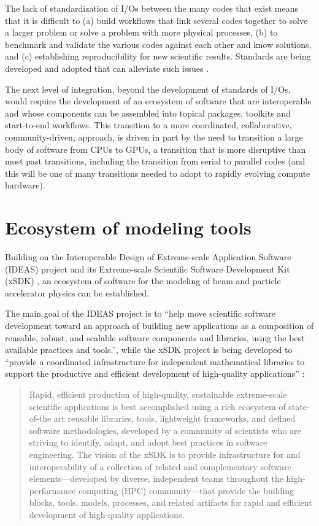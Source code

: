 \documentclass[11pt,sort&compress]{article}
\begin{document}
The lack of standardization of I/Os between the many codes that exist means that it is difficult to (a) build workflows that link several codes together to solve a larger problem or solve a problem with more physical processes, (b) to benchmark and validate the various codes against each other and know solutions, and (c) establishing reproducibility for new scientific results. Standards are being developed and adopted that can alleviate such issues \cite{LOI_standards}. 

The next level of integration, beyond the development of standards of I/Os, would require the development of an ecosystem of software that are interoperable and whose components can be assembled into topical packages, toolkits and start-to-end workflows. This transition to a more coordinated, collaborative, community-driven, approach, is driven in part by the need to transition a large body of software from CPUs to GPUs, a transition that is more disruptive than most past transitions, including the transition from serial to parallel codes (and this will be one of many transitions needed to adopt to rapidly evolving compute hardware).

\section{Ecosystem of modeling tools}

Building on the Interoperable Design of Extreme-scale Application Software (IDEAS) project \cite{IDEAS} and its Extreme-scale Scientific Software Development Kit (xSDK) \cite{xSDK}, an ecosystem of software for the modeling of beam and particle accelerator physics can be established.

The main goal of the IDEAS project is to ``help move scientific software development toward an approach of building new applications as a composition of reusable, robust, and scalable software components and libraries, using the best available practices and tools.'', while the 
xSDK project is being developed to ``provide a coordinated infrastructure for independent mathematical libraries to support the productive and efficient development of high-quality applications'' \cite{xSDK}:

\begin{quote}
Rapid, efficient production of high-quality, sustainable extreme-scale scientific applications is best accomplished using a rich ecosystem of state-of-the art reusable libraries, tools, lightweight frameworks, and defined software methodologies, developed by a community of scientists who are striving to identify, adapt, and adopt best practices in software engineering. The vision of the xSDK is to provide infrastructure for and interoperability of a collection of related and complementary software elements—developed by diverse, independent teams throughout the high-performance computing (HPC) community—that provide the building blocks, tools, models, processes, and related artifacts for rapid and efficient development of high-quality applications.
\end{quote}
\end{document}
